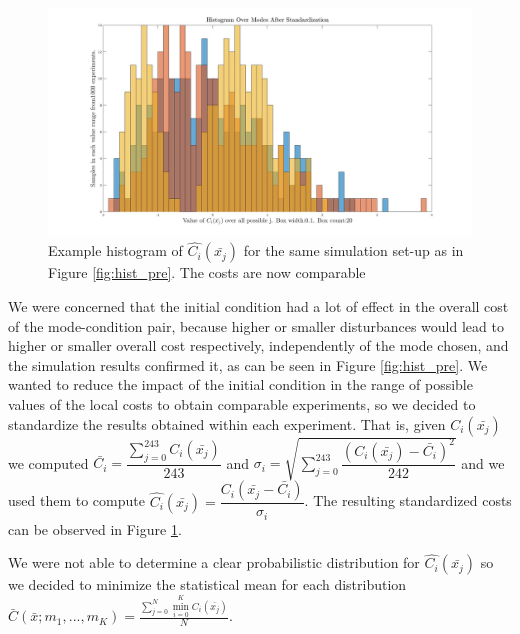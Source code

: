 \documentclass[12,twoside]{TFG-GM}
\theoremstyle{definition}
\theoremstyle{remark}
\newcommand*\mean[1]{\bar{#1}}
\newcommand*\diff[1]{\bar{#1}}
\begin{document}

\begin{figure}[htb!]
\begin{center}
\includegraphics[width=16cm]{hist_after_std.jpg}
\caption{\label{fig:hist_post} \small Example histogram of $\hat{C_i}(\diff{x_j})$ for the same simulation set-up as in Figure \ref{fig:hist_pre}. The costs are now comparable}
\end{center}
\end{figure}

We were concerned that the initial condition had a lot of effect in the overall cost of the mode-condition pair, because higher or smaller disturbances would lead to higher or smaller overall cost respectively, independently of the mode chosen, and the simulation results confirmed it, as can be seen in Figure \ref{fig:hist_pre}. We wanted to reduce the impact of the initial condition in the range of possible values of the local costs to  obtain comparable experiments, so we decided to standardize the results obtained within each experiment. That is, given $C_i(\diff{x_j})$ we computed $\mean{C_i} = \dfrac{\sum\limits_{j = 0}^{243}{C_i(\diff{x_j})}}{243}$ and $\sigma_i = \sqrt{\sum\limits_{j=0}^{243}{\dfrac{(C_i(\diff{x_j}) - \diff{C_i})^2} {242}}}$ and we used them to compute $\hat{C_i}(\diff{x_j}) = \dfrac{C_i(\diff{x_j} - \diff{C_i})}{\sigma_i}$. The resulting standardized costs can be observed in Figure \ref{fig:hist_post}.

We were not able to determine a clear probabilistic distribution for $\hat{C_i}(\diff{x_j})$ so we decided to minimize the statistical mean for each distribution $ \bar{C}(\diff{x}; m_1, ..., m_K) = \frac{\sum\limits_{j=0}^{N}{\min\limits_{i = 0}^{K}{C_i(\diff{x_j})}}}{N}$.
\end{document}
